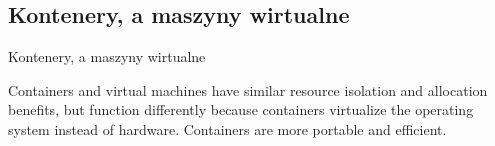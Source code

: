 \documentclass[aspectratio=169]{beamer}
\begin{document}
\subsection{Kontenery, a maszyny wirtualne}
\begin{frame}{Kontenery, a maszyny wirtualne}
    \begin{card}
        Containers and virtual machines have similar resource isolation and allocation benefits, 
        but function differently because containers virtualize the operating system instead of hardware. 
        Containers are more portable and efficient.
    \end{card}
\end{frame}
\end{document}
